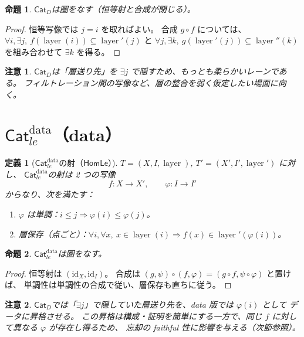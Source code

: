 \documentclass[a4paper,12pt]{ltjsarticle}
\newtheorem{definition}{定義}[section]
\newtheorem{proposition}{命題}[section]
\newtheorem{remark}{注意}[section]
\newcommand{\HomLe}{\ensuremath{\mathsf{HomLe}}}
\newcommand{\CatD}{\ensuremath{\mathsf{Cat}_D}}
\newcommand{\Catledata}{\ensuremath{\mathsf{Cat}_{le}^{\text{data}}}}
\newcommand{\layer}{\operatorname{layer}}
\begin{document}
\begin{proposition}
\CatD は圏をなす（恒等射と合成が閉じる）。
\end{proposition}

\begin{proof}
恒等写像では \(j=i\) を取ればよい。
合成 \(g\circ f\) については、
\(\forall i,\exists j,\ f(\layer(i))\subseteq \layer'(j)\) と
\(\forall j,\exists k,\ g(\layer'(j))\subseteq \layer''(k)\) を組み合わせて
\(\exists k\) を得る。
\end{proof}

\begin{remark}
\CatD は「層送り先」を \(\exists j\) で隠すため、もっとも柔らかいレーンである。
フィルトレーション間の写像など、層の整合を弱く仮定したい場面に向く。
\end{remark}

\section{\Catledata（data）}

\begin{definition}[\Catledata の射（\HomLe）]
\(T=(X,I,\layer)\), \(T'=(X',I',\layer')\) に対し、
\Catledata の射は 2 つの写像
\[
f:X\to X',\qquad \varphi:I\to I'
\]
からなり、次を満たす：
\begin{enumerate}[label=(\alph*)]
  \item \(\varphi\) は単調：\(i\le j \Rightarrow \varphi(i)\le \varphi(j)\)。
  \item 層保存（点ごと）：\(\forall i,\forall x,\ x\in\layer(i)\Rightarrow f(x)\in\layer'(\varphi(i))\)。
\end{enumerate}
\end{definition}

\begin{proposition}
\Catledata は圏をなす。
\end{proposition}

\begin{proof}
恒等射は \((\mathrm{id}_X,\mathrm{id}_I)\)。
合成は \((g,\psi)\circ(f,\varphi)=(g\circ f,\psi\circ \varphi)\) と置けば、
単調性は単調性の合成で従い、層保存も直ちに従う。
\end{proof}

\begin{remark}
\CatD では「\(\exists j\)」で隠していた層送り先を、data 版では \(\varphi(i)\) として \emph{データに昇格}させる。
この昇格は構成・証明を簡単にする一方で、同じ \(f\) に対して異なる \(\varphi\) が存在し得るため、
忘却の faithful 性に影響を与える（次節参照）。
\end{remark}
\end{document}
